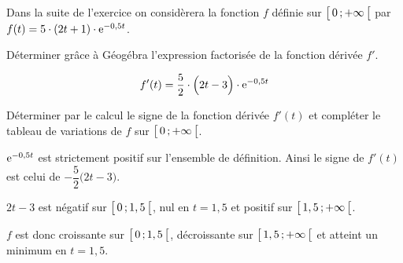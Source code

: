 \bigskip

Dans la suite de l'exercice on considèrera la fonction $f$ définie sur $\bigl[ \, 0 \, ; +\infty \,\bigl[$ par $f(t)=5\cdot (2t+1)\cdot \mathrm{e}^{-0,5t}$.

\begin{enumerate}[series=monDS, resume]
    \begin{minipage}{0.46\textwidth}
            \item Déterminer grâce à Géogébra l'expression factorisée de la fonction dérivée $f'$.

    \end{minipage}\hfill{}
    \begin{minipage}{0.48\textwidth}
\begin{blocvisiblex}[height=1.5]
    {\quad}

    \[f'(t)= \dfrac{5}{2}\cdot \Big(2t-3\Big)\cdot \mathrm{e}^{-0,5t}\]


    \end{blocvisiblex}
    \end{minipage}
    
    \medskip
    
    \item Déterminer par le calcul le signe de la fonction dérivée $f'(t)$ et compléter le tableau de variations de $f$ sur $\bigl[ \, 0 \, ; +\infty \,\bigl[$.
    \begin{blocvisiblex}[height=5.5]
    {
    \begin{minipage}{0.48\linewidth}
        \quad
    \end{minipage}\hfill{}
    \begin{minipage}{0.46\linewidth}
    \end{minipage}
    }
        \begin{minipage}{0.48\linewidth}
        $\mathrm{e}^{-0,5t}$ est strictement positif sur l'ensemble de définition. Ainsi le signe de $f'(t)$ est celui de $-\dfrac{5}{2}\big(2t-3\big)$.

        $2t-3$ est négatif sur $\bigl[ \, 0 \, ; 1,5 \,\bigl[$, nul en $t=1,5$ et positif sur $\bigl[ \, 1,5 \, ; +\infty \,\bigl[$.
    
        $f$ est donc croissante sur $\bigl[ \, 0 \, ; 1,5 \,\bigl[$, décroissante sur $\bigl[ \, 1,5 \, ; +\infty \,\bigl[$ et atteint un minimum en $t=1,5$.
    \end{minipage}\hfill{}
    \begin{minipage}{0.46\linewidth}
        \end{minipage}
\end{blocvisiblex}
\end{enumerate}

